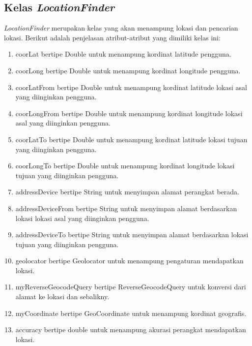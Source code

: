 \subsection{Kelas \textit{LocationFinder}}
\label{lab:Kelas LocationFinder}
\hspace{0.5cm} \textit{LocationFinder} merupakan kelas yang akan menampung lokasi dan pencarian lokasi. Berikut adalah penjelasan atribut-atribut yang dimiliki kelas ini:
\begin{enumerate}
	\item coorLat bertipe Double untuk menampung kordinat latitude pengguna.
	\item coorLong bertipe Double untuk menampung kordinat longitude pengguna.
	\item coorLatFrom bertipe Double untuk menampung kordinat latitude lokasi asal yang diinginkan pengguna.
	\item coorLongFrom bertipe Double untuk menampung kordinat longitude lokasi asal yang diinginkan pengguna.
	\item coorLatTo bertipe Double untuk menampung kordinat latitude lokasi tujuan yang diinginkan pengguna.
	\item coorLongTo bertipe Double untuk menampung kordinat longitude lokasi tujuan yang diinginkan pengguna.
	
	\item addressDevice bertipe String untuk menyimpan alamat perangkat berada.
	\item addressDeviceFrom bertipe String untuk menyimpan alamat berdasarkan lokasi lokasi asal yang diinginkan pengguna.
	\item addressDeviceTo bertipe String untuk menyimpan alamat berdasarkan lokasi tujuan yang diinginkan pengguna.
	
	\item geolocator bertipe Geolocator untuk menampung pengaturan mendapatkan lokasi.
	\item myReverseGeocodeQuery bertipe ReverseGeocodeQuery untuk konversi dari alamat ke lokasi dan sebalikny.
	\item myCoordinate bertipe GeoCoordinate untuk menampung kordinat geografis.
	\item accuracy bertipe double untuk menampung akurasi perangkat mendapatkan lokasi.
\end{enumerate}


